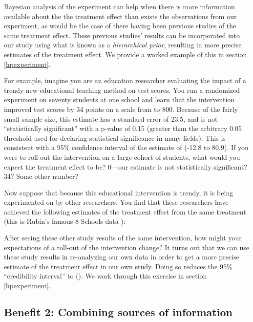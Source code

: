 \documentclass[]{book}
\begin{document}
Bayesian analysis of the experiment can help when there is more
information available about the the treatment effect than exists the
observations from our experiment, as would be the case of there having
been previous studies of the same treatment effect. These previous
studies' results can be incorporated into our study using what is known
as a \emph{hierarchical prior}, resulting in more precise estimates of
the treatment effect. We provide a worked example of this in section
\ref{hpexperiment}.

For example, imagine you are an education researcher evaluating the
impact of a trendy new educational teaching method on test scores. You
run a randomized experiment on seventy students at one school and learn
that the intervention improved test scores by 34 points on a scale from
to 800. Because of the fairly small sample size, this estimate has a
standard error of 23.5, and is not ``statistically significant'' with a
p-value of 0.15 (greater than the arbitrary 0.05 threshold used for
declaring statistical significance in many fields). This is consistent
with a 95\% confidence interval of the estimate of (-12.8 to 80.9). If
you were to roll out the intervention on a large cohort of students,
what would you expect the treatment effect to be? 0---our estimate is
not statistically significant? 34? Some other number?

Now suppose that because this educational intervention is trendy, it is
being experimented on by other researchers. You find that these
researchers have achieved the following estimates of the treatment
effect from the same treatment (this is Rubin's famous 8 Schools data
\citep{rubin8schools}):

After seeing these other study results of the same intervention, how
might your expectations of a roll-out of the intervention change? It
turns out that we can use these study results in re-analyzing our own
data in order to get a more precise estimate of the treatment effect in
our own study. Doing so reduces the 95\% ``credibility interval'' to ().
We work through this exercise in section \ref{hpexperiment}.

\subsection*{Benefit 2: Combining sources of
information}\label{benefit-2-combining-sources-of-information}
\end{document}
